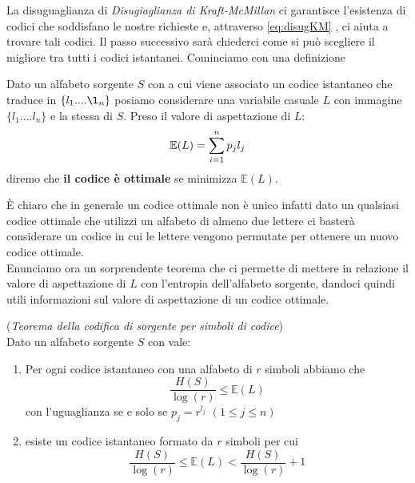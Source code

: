La disuguaglianza di \textit{Disugiaglianza di Kraft-McMillan} ci garantisce l'esistenza di codici che soddisfano le nostre richieste e, attraverso \ref{eq:disugKM} , ci aiuta a trovare tali codici. Il passo successivo sarà chiederci come si può scegliere il migliore tra tutti i codici istantanei. Cominciamo con una definizione

\begin{defi}
Dato un alfabeto sorgente $S$ \va  con \lep  a cui viene associato un codice istantaneo che traduce \va   in $\{ l_1....\l_n \}$ posiamo considerare una variabile casuale $L$ con immagine $\{ l_1....l_n \}$ e \lep  la stessa di $S$. Preso il valore di aspettazione di $L$:
$$\mathbb{E}(L)=\sum_{i=1}^n p_j l_j$$ 
diremo che \textbf{il codice è ottimale} se minimizza $\mathbb{E}(L)$.
\end{defi}
È chiaro che in generale un codice ottimale non è unico infatti dato un qualsiasi codice ottimale che utilizzi un alfabeto di almeno due lettere ci basterà considerare un codice in cui le lettere vengono permutate per ottenere un nuovo codice ottimale.\\
Enunciamo ora un sorprendente teorema che ci permette di mettere in relazione il valore di aspettazione di $L$ con l'entropia dell'alfabeto sorgente, dandoci quindi utili informazioni sul valore di aspettazione di un codice ottimale.
 
\begin{teo}(\textit{Teorema della codifica di sorgente per simboli di codice})\\
Dato un alfabeto sorgente $S$ con \lep vale:
\begin{enumerate}
\item Per ogni codice istantaneo con una alfabeto di $r$ simboli abbiamo che
\begin{equation}
\frac{H(S)}{\log (r)} \leq \mathbb{E}(L)
\end{equation}
con l'uguaglianza se e solo se $p_j=r^{l_j}$ $(1 \leq j \leq n)$
\item esiste un codice istantaneo formato da $r$ simboli per cui
\begin{equation}
\frac{H(S)}{\log (r)} \leq \mathbb{E}(L) < \frac{H(S)}{\log (r)} +1
\end{equation}
\end{enumerate}
\end{teo}

